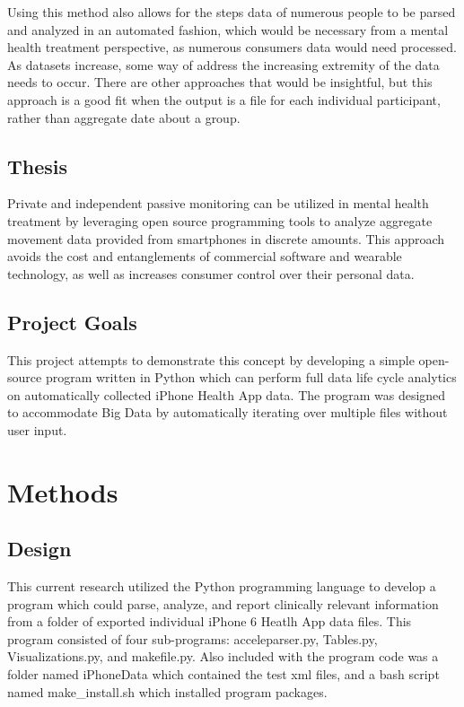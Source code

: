 \documentclass[sigconf]{acmart}
\begin{document}
Using this method also allows for the steps data of numerous people to be parsed and analyzed in an automated fashion, which would be necessary from a mental health treatment perspective, as numerous consumers data would need processed. As datasets increase, some way of address the increasing extremity of the data needs to occur. There are other approaches that would be insightful, but this approach is a good fit when the output is a file for each individual participant, rather than aggregate date about a group.

\subsection{Thesis}

Private and independent passive monitoring can be utilized in mental health treatment by leveraging open source programming tools to analyze aggregate movement data provided from smartphones in discrete amounts. This approach avoids the cost and entanglements of commercial software and wearable technology, as well as increases consumer control over their personal data. 

\subsection{Project Goals} This project attempts to demonstrate this concept by developing a simple open-source program written in Python which can perform full data life cycle analytics on automatically collected iPhone Health App data. The program was designed to accommodate Big Data by automatically iterating over multiple files without user input.

\section{Methods}

\subsection{Design}

This current research utilized the Python programming language to develop a program which could parse, analyze, and report clinically relevant information from a folder of exported individual iPhone 6 Heatlh App data files. This program consisted of four sub-programs: acceleparser.py, Tables.py, Visualizations.py, and makefile.py. Also included with the program code was a folder named iPhoneData which contained the test xml files, and a bash script named make\_install.sh which installed program packages. 
\end{document}
